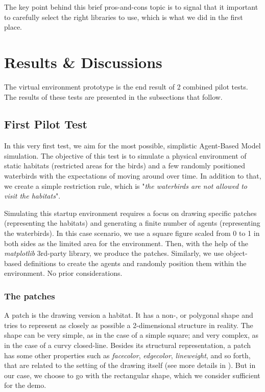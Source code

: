 \noindent
The key point behind this brief pros-and-cons topic is to signal that it important to carefully select the right libraries to use, which is what we did in the first place.

\section{Results \& Discussions}

The virtual environment prototype is the end result of 2 combined pilot tests. The results of these tests are presented in the subsections that follow.

\subsection{First Pilot Test}
In this very first test, we aim for the most possible, simplistic Agent-Based Model simulation. The objective of this test is to simulate a physical environment of static habitats (restricted areas for the birds) and a few randomly positioned waterbirds with the expectations of moving around over time. In addition to that, we create a simple restriction rule, which is "\textit{the waterbirds are not allowed to visit the habitats}".

Simulating this startup environment requires a focus on drawing specific patches (representing the habitats) and generating a finite number of agents (representing the waterbirds). In this case scenario, we use a square figure scaled from 0 to 1 in both sides as the limited area for the environment. Then, with the help of the \emph{matplotlib} 3rd-party library, we produce the patches. Similarly, we use object-based definitions to create the agents and randomly position them within the environment. No prior considerations.

\subsubsection{The patches}
A patch is the drawing version a habitat. It has a non-, or polygonal shape and tries to represent as closely as possible a 2-dimensional structure in reality. The shape can be very simple, as in the case of a simple square; and very complex, as in the case of a curvy closed-line. Besides its structural representation, a patch has some other properties such as \emph{facecolor}, \emph{edgecolor}, \emph{lineweight}, and so forth, that are related to the setting of the drawing itself (see more details in \cite{matplotlib.patches}). But in our case, we choose to go with the rectangular shape, which we consider sufficient for the demo.


